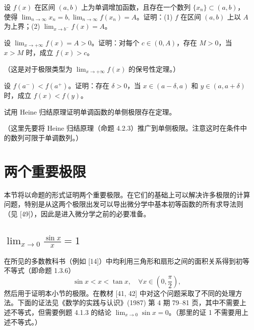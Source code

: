 \begin{xexercise}[8]
设 $f(x)$ 在区间 $(a,b)$ 上为单调增加函数，且存在一个数列 $\{x_n\}\subset(a,b)$，使得 $\lim_{n\to\infty}x_n=b,\lim_{n\to\infty}f(x_n)=A$。证明：(1) $f$ 在区间 $(a,b)$ 上以 $A$ 为上界；(2) $\lim_{x\to b^-}f(x)=A$。
\end{xexercise}

\begin{xexercise}[9]
设 $\lim_{x\to+\infty}f(x)=A>0$。证明：对每个 $c\in(0,A)$，存在 $M>0$，当 $x>M$ 时，成立 $f(x)>c$。

  （这是对于极限类型为 $\lim_{x\to+\infty}f(x)$ 的保号性定理。）
\end{xexercise}

\begin{xexercise}[10]
设 $f(a^-)<f(a^+)$。证明：存在 $\delta>0$，当 $x\in(a-\delta,a)$ 和 $y\in(a,a+\delta)$ 时，成立 $f(x)<f(y)$。
\end{xexercise}

\begin{xexercise}[11]
试用 Heine 归结原理证明单调函数的单侧极限存在定理。

  （这里先要将 Heine 归结原理（命题 4.2.3）推广到单侧极限。注意这时在条件中的数列可限于单调数列。）
\end{xexercise}

\section{两个重要极限}

本节将以命题的形式证明两个重要极限。在它们的基础上可以解决许多极限的计算问题，特别是从这两个极限出发可以导出微分学中基本初等函数的所有求导法则（见 [49]），因此是进入微分学之前的必要准备。

\subsection{\texorpdfstring{$\displaystyle\lim_{x\to0}\frac{\sin x}{x}=1$}{极限 sin(x)/x = 1}}

在所见的多数教科书（例如 [14]）中均利用三角形和扇形之间的面积关系得到初等不等式（即命题 1.3.6）
\[
  \sin x<x<\tan x,\quad \forall x\in\left(0,\frac\pi2\right),
\]
然后用于证明本小节的极限。在教材 [41, 42] 中对这个问题采取了不同的处理方法。下面的证法见《数学的实践与认识》(1987) 第 4 期 79--81 页，其中不需要上述不等式，但需要例题 4.1.3 的结论 $\lim_{x\to0}\sin x=0$。（那里的证 1 不需要用上述不等式。）

